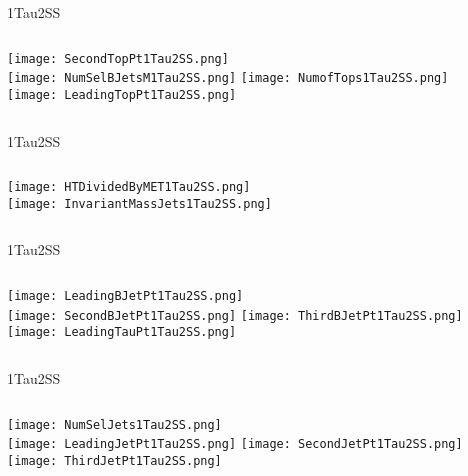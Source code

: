 \documentclass{beamer}
\begin{document}
\begin{frame}{1Tau2SS}
    \begin{columns}[t]
    \centering
    \texttt{[image: SecondTopPt1Tau2SS.png]}\\
    \texttt{[image: NumSelBJetsM1Tau2SS.png]}
    \centering
    \texttt{[image: NumofTops1Tau2SS.png]}\\
    \texttt{[image: LeadingTopPt1Tau2SS.png]}
    \end{columns}
\end{frame}


\begin{frame}{1Tau2SS}
    \begin{columns}[t]
    \centering
    \texttt{[image: HTDividedByMET1Tau2SS.png]}\\
    \centering
    \texttt{[image: InvariantMassJets1Tau2SS.png]}
    \end{columns}
\end{frame}
\begin{frame}{1Tau2SS}
    \begin{columns}[t]
    \centering
    \texttt{[image: LeadingBJetPt1Tau2SS.png]}\\
    \texttt{[image: SecondBJetPt1Tau2SS.png]}
    \centering
    \texttt{[image: ThirdBJetPt1Tau2SS.png]}\\
    \texttt{[image: LeadingTauPt1Tau2SS.png]}
    \end{columns}
\end{frame}
\begin{frame}{1Tau2SS}
    \begin{columns}[t]
    \centering
    \texttt{[image: NumSelJets1Tau2SS.png]}\\
    \texttt{[image: LeadingJetPt1Tau2SS.png]}
    \centering
    \texttt{[image: SecondJetPt1Tau2SS.png]}\\
    \texttt{[image: ThirdJetPt1Tau2SS.png]}
    \end{columns}
\end{frame}
\end{document}
